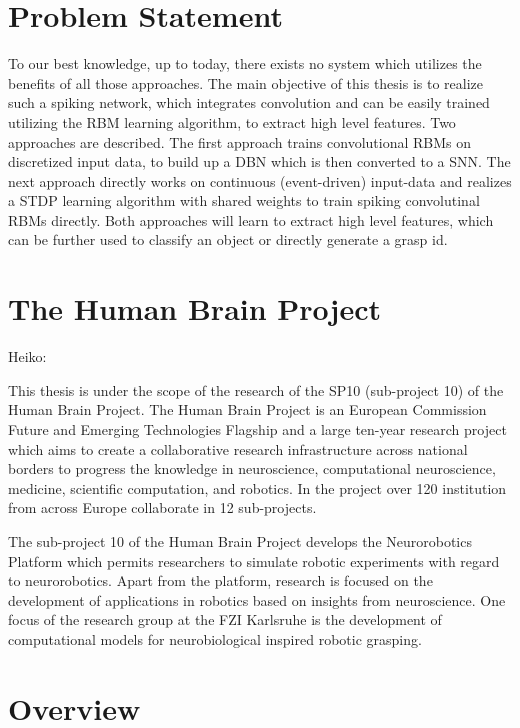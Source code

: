 \section{Problem Statement}

To our best knowledge, up to today, there exists no system which utilizes the benefits of all those approaches. 
The main objective of this thesis is to realize such a spiking network, which integrates convolution and can be easily trained utilizing the RBM learning algorithm, to extract high level features. 
Two approaches are described. 
The first approach trains convolutional RBMs on discretized input data, to build up a DBN which is then converted to a SNN. 
The next approach directly works on continuous (event-driven) input-data and realizes a STDP learning algorithm with shared weights to train spiking convolutinal RBMs directly. 
Both approaches will learn to extract high level features, which can be further used to classify an object or directly generate a grasp id. 

\section{The Human Brain Project}

Heiko:

This thesis is under the scope of the research of the SP10 (sub-project 10) of the Human Brain
Project. The Human Brain Project is an European Commission Future and Emerging Technologies Flagship and a large ten-year research project which aims to create a collaborative research infrastructure across national borders to progress the knowledge in neuroscience, computational neuroscience, medicine, scientific computation, and robotics. In the project over 120
institution from across Europe collaborate in 12 sub-projects.

The sub-project 10 of the Human Brain Project develops the Neurorobotics Platform which
permits researchers to simulate robotic experiments with regard to neurorobotics. Apart from the
platform, research is focused on the development of applications in robotics based on insights
from neuroscience. One focus of the research group at the FZI Karlsruhe is the development of
computational models for neurobiological inspired robotic grasping.


\section{Overview}

